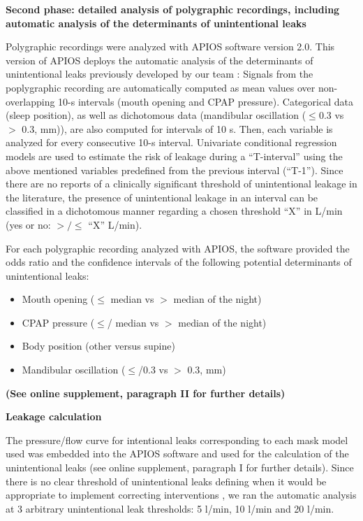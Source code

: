 \medbreak
 
\textbf{Second phase: detailed analysis of polygraphic recordings, including automatic analysis of the determinants of unintentional leaks}

Polygraphic recordings were analyzed with APIOS software version 2.0. This version of APIOS deploys the automatic analysis of the determinants of unintentional leaks previously developed by our team \citep{lebret2018}: Signals from the poplygraphic recording are automatically computed as mean values over non-overlapping 10-s intervals (mouth opening and CPAP pressure). Categorical data (sleep position), as well as dichotomous data (mandibular oscillation ($\le$0.3 vs $>$ 0.3, mm)), are also computed for intervals of 10 s. Then, each variable is analyzed for every consecutive 10-s interval. Univariate conditional regression models are used to estimate the risk of leakage during a “T-interval” using the above mentioned variables predefined from the previous interval (“T-1”). Since there are no reports of a clinically significant threshold of unintentional leakage in the literature, the presence of unintentional leakage in an interval can be classified in a dichotomous manner regarding a chosen threshold “X” in L/min (yes or no: $>/\le$ “X” L/min). 

For each polygraphic recording analyzed with APIOS, the software provided the odds ratio and the confidence intervals of the following potential determinants of unintentional leaks:
\begin{itemize}
    \item Mouth opening ($\le$ median vs $>$ median of the night)
    \item CPAP pressure ($\le$/ median vs $>$ median of the night)
    \item Body position (other versus supine)
    \item Mandibular oscillation ($\le$/0.3 vs $>$ 0.3, mm)
\end{itemize}

\textbf{(See online supplement, paragraph II for further details)}
\medbreak

\textbf{Leakage calculation}

The pressure/flow curve for intentional leaks corresponding to each mask model used was embedded into the APIOS software and used for the calculation of the unintentional leaks (see online supplement, paragraph I  for further details). Since there is no clear threshold of unintentional leaks defining when it would be appropriate to implement correcting interventions \citep{schwab}, we ran the automatic analysis at 3 arbitrary unintentional leak thresholds: 5 l/min, 10 l/min and 20 l/min.

